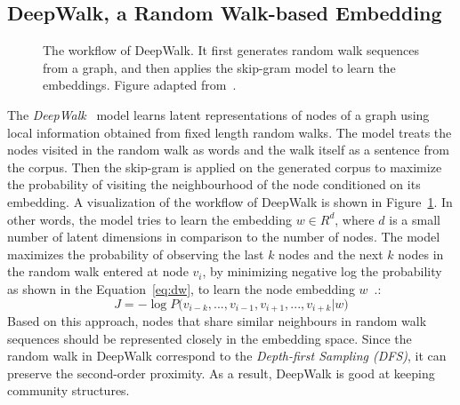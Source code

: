 \subsection{DeepWalk, a Random Walk-based Embedding}
\label{subsec:DeepWalk}
\begin{figure}
\centering 
\resizebox{0.8\textwidth}{0.35\textwidth}{      

}
\caption{The workflow of DeepWalk. It first generates random walk sequences from a graph, and then applies the skip-gram model to learn the embeddings. Figure adapted from~.}
\label{fig:deepwalk}
\end{figure}

The \emph{DeepWalk}~ model learns latent representations of nodes of a graph using local information obtained from fixed length random walks. The model treats the nodes visited in the random walk as words and the walk itself as  a sentence from the corpus. Then the skip-gram is applied on the generated corpus to maximize the probability of visiting the neighbourhood of the node conditioned on its embedding. A visualization of the workflow of DeepWalk is shown in Figure~\ref{fig:deepwalk}. In other words, the model tries to learn the embedding $w\in R^{ d} $, where $d$ is a small number of latent dimensions in comparison to the number of nodes. The model maximizes the probability of observing the last $k$ nodes and the next $k$ nodes in the random walk entered at node $v_{i}$, by minimizing negative log the probability as shown in the Equation~\ref{eq:dw}, to learn the node embedding $w$~.: 
\begin{equation}
J=-\log { P( } v_{ { i−k } },...,v_{ i−1 },v_{ i+1 },...,v_{ i+k }|w )
\label{eq:dw}
\end{equation}
Based on this approach, nodes that share similar neighbours in random walk sequences should be represented closely in the embedding space. Since the random walk in DeepWalk correspond to the \emph{Depth-first Sampling (DFS)}, it can preserve the second-order proximity. As a result, DeepWalk is good at keeping community structures. 
